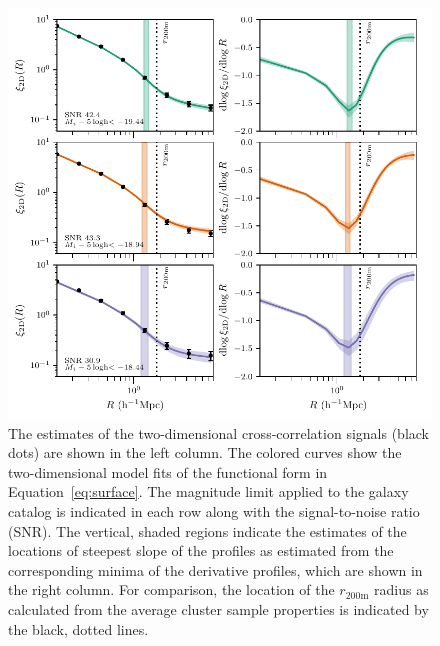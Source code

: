 \documentclass[iop, apjl, twocolappendix, numberedappendix]{emulateapj}
\begin{document}
\begin{figure}
    \includegraphics[scale=0.65]{2D_graphs_with_spline_no_mc.pdf}
\caption{The estimates of the two-dimensional cross-correlation
signals (black dots) are shown in the left column. The colored
curves show the two-dimensional model fits of the functional
form in Equation~\ref{eq:surface}. The magnitude limit applied to the galaxy
catalog is indicated in each row along with the signal-to-noise ratio (SNR). 
The vertical, shaded regions indicate the estimates of the locations of 
steepest slope of the profiles as estimated from the corresponding minima of the
derivative profiles, which are shown in the right column. For
comparison, the location of the $r_{\mathrm{200m}}$ radius as
calculated from the average cluster sample properties is indicated
by the black, dotted lines.}
   \label{fig:2D_graphs}
\end{figure}
\end{document}
